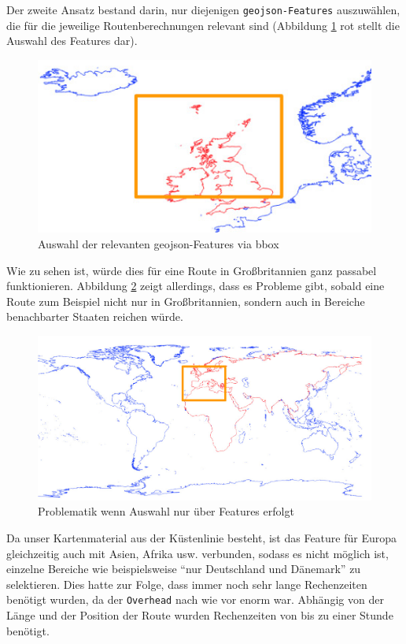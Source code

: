 \documentclass[letterpaper]{article}
\begin{document}
	Der zweite Ansatz bestand darin, nur diejenigen \texttt{geojson-Features} auszuwählen, die für die jeweilige Routenberechnungen relevant sind (Abbildung \ref{fig:select_features} rot stellt die Auswahl des Features dar).

	\begin{figure}[!htbp]
		\centering
		\includegraphics[width=\linewidth]{select_features}
		\caption{Auswahl der relevanten geojson-Features via bbox}
		\label{fig:select_features}
	\end{figure}

	Wie zu sehen ist, würde dies für eine Route in Großbritannien ganz passabel funktionieren. Abbildung \ref{fig:select_features_problem} zeigt allerdings, dass es Probleme gibt, sobald eine Route zum Beispiel nicht nur in Großbritannien, sondern auch in Bereiche benachbarter Staaten reichen würde. 

	\begin{figure}[!htbp]
		\centering
		\includegraphics[width=\linewidth]{select_features_problem}
		\caption{Problematik wenn Auswahl nur über Features erfolgt}
		\label{fig:select_features_problem}
	\end{figure}

	Da unser Kartenmaterial aus der Küstenlinie besteht, ist das Feature für Europa gleichzeitig auch mit Asien, Afrika usw. verbunden, sodass es nicht möglich ist, einzelne Bereiche wie beispielsweise "`nur Deutschland und Dänemark"' zu selektieren. Dies hatte zur Folge, dass immer noch sehr lange Rechenzeiten benötigt wurden, da der \texttt{Overhead} nach wie vor enorm war. Abhängig von der Länge und der Position der Route wurden Rechenzeiten von bis zu einer Stunde benötigt.
\end{document}
